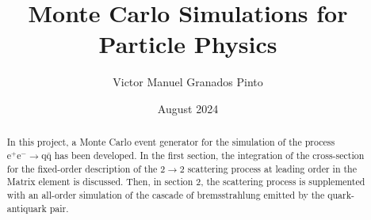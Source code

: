 \documentclass{article}
\title{Monte Carlo Simulations for Particle Physics}
\author{Victor Manuel Granados Pinto}
\date{August 2024}
\begin{document}
\maketitle

\begin{abstract}
    In this project, a Monte Carlo event generator for the simulation of the process $\mathrm{e}^{+} \mathrm{e}^{-} \to \mathrm{q} \bar{\mathrm{q}}$ has been developed. In the first section, the integration of the cross-section for the fixed-order description of the $2 \to 2$ scattering process at leading order in the Matrix element is discussed. Then, in section 2, the scattering process is supplemented with an all-order simulation of the cascade of bremsstrahlung emitted by the quark-antiquark pair.
\end{abstract}

\tableofcontents





\begin{appendix}
    
    
\end{appendix}
\end{document}
